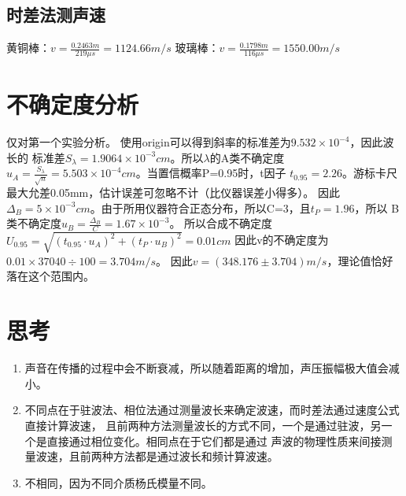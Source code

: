 \documentclass[UTF8]{ctexart}
\begin{document}
\subsection{时差法测声速}
黄铜棒：$v=\frac{0.2463m}{219\mu s}=1124.66m/s$
\newline
玻璃棒：$v=\frac{0.1798m}{116\mu s}=1550.00m/s$
\newpage
\section{不确定度分析}
仅对第一个实验分析。
\newline
使用origin可以得到斜率的标准差为$9.532\times 10^{-4}$，因此波长的
标准差$S_{\lambda}=1.9064\times 10^{-3}cm$。所以$\lambda$的A类不确定度
$u_A=\frac{S_{\lambda}}{\sqrt{n}}=5.503\times 10^{-4}cm$。当置信概率P=0.95时，t因子
$t_{0.95}=2.26$。游标卡尺最大允差0.05mm，估计误差可忽略不计（比仪器误差小得多）。
因此$\Delta_B=5\times 10^{-3}cm$。由于所用仪器符合正态分布，所以C=3，且$t_P=1.96$，所以
B类不确定度$u_B=\frac{\Delta_B}{C}=1.67\times 10^{-3}$。
\newline
所以合成不确定度$U_{0.95}=\sqrt{\left( t_{0.95}\cdot u_A \right)^2+\left( t_P\cdot u_B \right)^2}=0.01cm$
因此v的不确定度为$0.01\times 37040\div 100=3.704m/s$。
\newline
因此$v=\left( 348.176\pm 3.704 \right)m/s$，理论值恰好落在这个范围内。
\section{思考}
\begin{enumerate}
    \item 声音在传播的过程中会不断衰减，所以随着距离的增加，声压振幅极大值会减小。
    \item 不同点在于驻波法、相位法通过测量波长来确定波速，而时差法通过速度公式直接计算波速，
    且前两种方法测量波长的方式不同，一个是通过驻波，另一个是直接通过相位变化。相同点在于它们都是通过
    声波的物理性质来间接测量波速，且前两种方法都是通过波长和频计算波速。
    \item 不相同，因为不同介质杨氏模量不同。
\end{enumerate}
\end{document}
